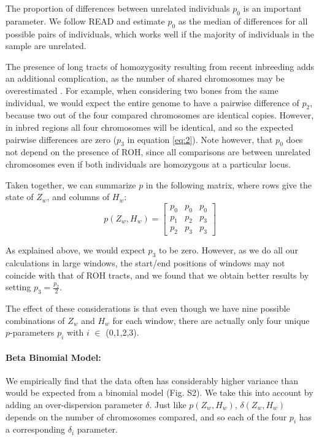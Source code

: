 \documentclass[12pt, letterpaper]{article}
\begin{document}
The proportion of differences between unrelated individuals $p_0$ is an important parameter. We follow READ \cite{kuhn_estimating_2018} and estimate $p_0$ as the median of differences for all possible pairs of individuals, which works well if the majority of individuals in the sample are unrelated.

The presence of long tracts of homozygosity resulting from recent inbreeding adds an additional complication, as the number of shared chromosomes may be overestimated \cite{weir_genetic_2006}. For example, when considering two bones from the same individual, we would expect the entire genome to have a pairwise difference of $p_2$, because two out of the four compared chromosomes are identical copies. However, in inbred regions all four chromosomes will be identical, and so the expected pairwise differences are zero ($p_3$ in equation \ref{eq:2}). Note however, that $p_0$ does not depend on the presence of ROH, since all comparisons are between unrelated chromosomes even if both individuals are homozygous at a particular locus. 

Taken together, we can summarize $p$ in the following matrix, where rows give the state of $Z_w$, and columns of $H_w$:
\begin{equation}\label{eq:2}
    p(Z_w, H_w) = \left[\begin{array}
{rrr}
p_0 & p_0 & p_0 \\
p_1 & p_2 & p_3 \\
p_2 & p_3 & p_3
\end{array}\right]
\end{equation}

As explained above, we would expect $p_3$ to be zero. However, as we do all our calculations in large windows, the start/end positions of windows may not coincide with that of ROH tracts, and we found that we obtain better results by setting $p_3 = \frac{p_2}{2}$.

The effect of these considerations is that even though we have nine possible combinations of $Z_w$ and $H_w$ for each window, there are actually only four unique $p$-parameters $p_i$ with $i$ $\in$ (0,1,2,3). 

\paragraph{Beta Binomial Model:}
We empirically find that the data often has considerably higher variance than would be expected from a binomial model (Fig. S2). We take this into account by adding an over-dispersion parameter $\delta$. Just like $p(Z_w,H_w)$, $\delta(Z_w,H_w)$ depends on the number of chromosomes compared, and so each of the  four $p_i$ has a corresponding $\delta_i$ parameter. 
\end{document}
